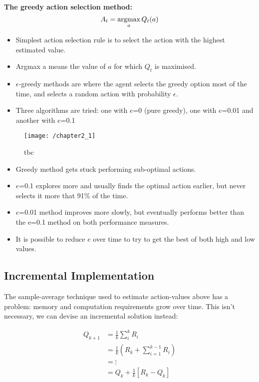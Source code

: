 \noindent \textbf{The greedy action selection method:}
\begin{equation} \label{eq: argmax}
A_t =\operatorname*{\arg\!\max}_a Q_t(a)
\end{equation}

\begin{itemize}
	\item Simplest action selection rule is to select the action with the highest estimated value.
	\item Argmax a means the value of \(a\) for which \(Q_t\) is maximised.
	\item \(\epsilon\)-greedy methods are where the agent selects the greedy option most of the time, and selects a random action with probability \(\epsilon\).
	\item Three algorithms are tried: one with \(e\)=0 (pure greedy), one with \(e\)=0.01 and another with \(e\)=0.1
\end{itemize}

\begin{figure}[h!]
	\centering
	\texttt{[image: /chapter2\_1]}
	\caption{tbc}
	\label{fig:chapter2_1}
\end{figure}

\begin{itemize}
	\item Greedy method gets stuck performing sub-optimal actions.
	\item \(e\)=0.1 explores more and usually finds the optimal action earlier, but never selects it more that 91\% of the time.
	\item \(e\)=0.01 method improves more slowly, but eventually performs better than the e=0.1 method on both performance measures.
	\item It is possible to reduce \(e\) over time to try to get the best of both high and low values.
\end{itemize}

\subsection{Incremental Implementation}
The sample-average technique used to estimate action-values above has a problem: memory and computation requirements grow over time. This isn't necessary, we can devise an incremental solution instead:

\begin{align}
	Q_{k+1} &= \frac{1}{k}\sum_{i}^{k}R_i \nonumber \\
	&= \frac{1}{k} \left( R_k + \sum_{i=1}^{k-1} R_i \right) \nonumber \\
	&= \vdots \\
	&= Q_k + \frac{1}{k} \left[R_k - Q_k\right] \\
\end{align}

